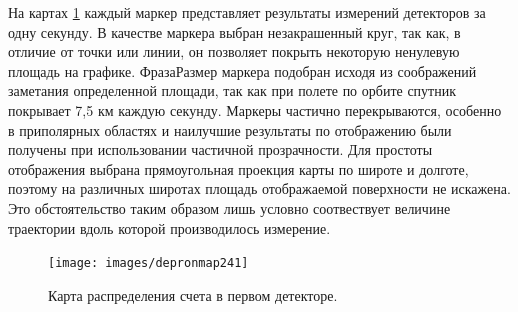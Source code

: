 %
На картах 	\ref{fig:depronmap241} каждый маркер представляет результаты измерений детекторов за одну секунду. В качестве маркера выбран незакрашенный круг, так как, в отличие от точки или линии, он позволяет покрыть некоторую  ненулевую площадь на графике. \glqq Фраза\grqq Размер маркера подобран исходя из соображений заметания определенной площади, так как  при полете по орбите спутник покрывает 7,5 км каждую секунду. Маркеры частично перекрываются, особенно в приполярных областях и наилучшие результаты по отображению были получены при использовании частичной прозрачности. Для простоты отображения выбрана прямоугольная проекция карты по широте и долготе, поэтому на различных широтах площадь отображаемой поверхности не искажена. Это обстоятельство таким образом лишь условно соотвествует величине траектории вдоль которой производилось измерение.
\begin{figure}[h]
	\centering
	\texttt{[image: images/depronmap241]}
	\caption{Карта распределения счета в первом детекторе.}
	\label{fig:depronmap241}
\end{figure}

